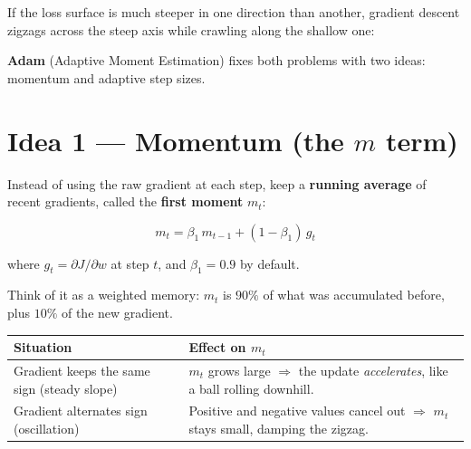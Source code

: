 \documentclass[12pt, a4paper]{article}
\begin{document}
If the loss surface is much steeper in one direction than another, gradient
descent zigzags across the steep axis while crawling along the shallow one:

\begin{center}
\end{center}

\textbf{Adam} (Adaptive Moment Estimation) fixes both problems with two ideas:
momentum and adaptive step sizes.

\section{Idea 1 — Momentum (the $m$ term)}

Instead of using the raw gradient at each step, keep a \textbf{running
  average} of recent gradients, called the \textbf{first moment} $m_t$:

\[
  m_t = \beta_1 \, m_{t-1} + (1 - \beta_1)\, g_t
\]

where $g_t = \partial J / \partial w$ at step $t$, and $\beta_1 = 0.9$ by
default.

Think of it as a weighted memory: $m_t$ is $90\%$ of what was accumulated
before, plus $10\%$ of the new gradient.

\begin{center}
  \renewcommand{\arraystretch}{1.3}
  \begin{tabular}{lp{9cm}}
    \toprule
    Situation                                   & Effect on $m_t$ \\
    \midrule
    Gradient keeps the same sign (steady slope) &
    $m_t$ grows large $\Rightarrow$ the update \emph{accelerates}, like a
    ball rolling downhill.                                        \\
    Gradient alternates sign (oscillation)      &
    Positive and negative values cancel out $\Rightarrow$ $m_t$ stays small,
    damping the zigzag.                                           \\
    \bottomrule
  \end{tabular}
\end{center}
\end{document}
